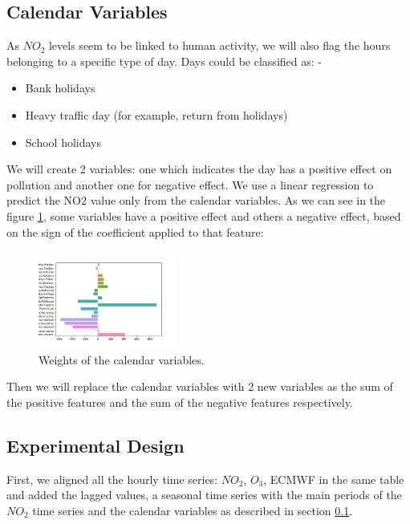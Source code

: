 \documentclass[a4paper,twocolumn,5p]{elsarticle}
\begin{document}
\subsection{Calendar Variables}
\label{sec:cal_data}

As $NO_2$ levels seem to be linked to human activity, we will also flag the hours 
belonging to a specific type of day. Days could be classified as:
-\begin{itemize}
  \item Bank holidays
  \item Heavy traffic day (for example, return from holidays)
  \item School holidays
\end{itemize} 

We will create 2 variables: one which indicates the day has a positive effect on pollution and 
another one for negative effect. We use a linear regression to predict the NO2 value only from the calendar variables.
As we can see in the figure \ref{figure:fourier}, some variables have a positive effect and others a negative effect, based on the
sign of the coefficient applied to that feature:

\begin{figure}
  \centering
  \includegraphics[width=0.4\textwidth]{calweights}
  \caption{Weights of the calendar variables.}
  \label{figure:fourier}
\end{figure}

Then we will replace the calendar variables with 2 new variables as the sum of the positive 
features and the sum of the negative features respectively.

\subsection{Experimental Design}
\label{sec:experimental-design}

First, we aligned all the hourly time series: $NO_2$, $O_3$, ECMWF in the same table 
and added the lagged values, a seasonal time series with the main periods of the $NO_2$ time series
and the calendar variables as described in section \ref{sec:cal_data}.
\end{document}
